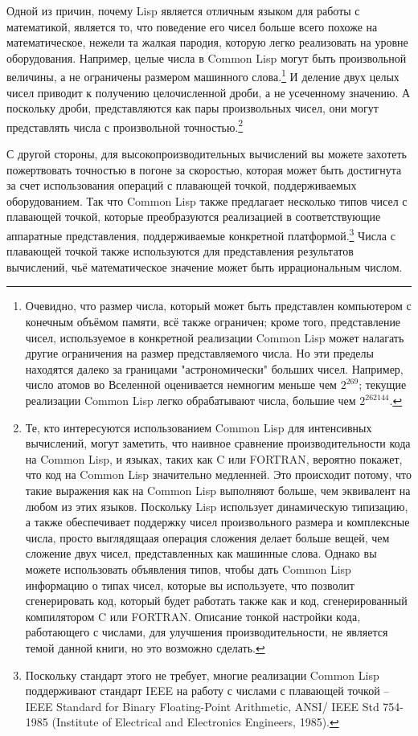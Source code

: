 Одной из причин, почему Lisp является отличным языком для работы с математикой, является
то, что поведение его чисел больше всего похоже на математическое, нежели та жалкая
пародия, которую легко реализовать на уровне оборудования.  Например, целые числа в Common
Lisp могут быть произвольной величины, а не ограничены размером машинного
слова.\footnote{Очевидно, что размер числа, который может быть представлен компьютером с
  конечным объёмом памяти, всё также ограничен; кроме того, представление чисел,
  используемое в конкретной реализации Common Lisp может налагать другие ограничения на
  размер представляемого числа.  Но эти пределы находятся далеко за границами
  "астрономически" больших чисел.  Например, число атомов во Вселенной оценивается
  немногим меньше чем $2^{269}$; текущие реализации Common Lisp легко обрабатывают числа,
  большие чем $2^{262144}$.}  И деление двух целых чисел приводит к получению
целочисленной дроби, а не усеченному значению.  А поскольку дроби, представляются как пары
произвольных чисел, они могут представлять числа с произвольной точностью.\footnote{Те,
  кто интересуются использованием Common Lisp для интенсивных вычислений, могут заметить,
  что наивное сравнение производительности кода на Common Lisp, и языках, таких как C или
  FORTRAN, вероятно покажет, что код на Common Lisp значительно медленней.  Это происходит
  потому, что такие выражения как  на Common Lisp выполняют больше, чем
  эквивалент  на любом из этих языков.  Поскольку Lisp использует динамическую
  типизацию, а также обеспечивает поддержку чисел произвольного размера и комплексные
  числа, просто выглядящаая операция сложения делает больше вещей, чем сложение двух
  чисел, представленных как машинные слова.  Однако вы можете использовать объявления
  типов, чтобы дать Common Lisp информацию о типах чисел, которые вы используете, что
  позволит сгенерировать код, который будет работать также как и код, сгенерированный
  компилятором C или FORTRAN.  Описание тонкой настройки кода, работающего с числами, для
  улучшения производительности, не является темой данной книги, но это возможно сделать.}

С другой стороны, для высокопроизводительных вычислений вы можете захотеть пожертвовать
точностью в погоне за скоростью, которая может быть достигнута за счет использования
операций с плавающей точкой, поддерживаемых оборудованием.  Так что Common Lisp также
предлагает несколько типов чисел с плавающей точкой, которые преобразуются реализацией в
соответствующие аппаратные представления, поддерживаемые конкретной
платформой.\footnote{Поскольку стандарт этого не требует, многие реализации Common Lisp
  поддерживают стандарт IEEE на работу с числами с плавающей точкой -- IEEE Standard for
  Binary Floating-Point Arithmetic, ANSI/ IEEE Std 754-1985 (Institute of Electrical and
  Electronics Engineers, 1985).}  Числа с плавающей точкой также используются для
представления результатов вычислений, чьё математическое значение может быть
иррациональным числом.

